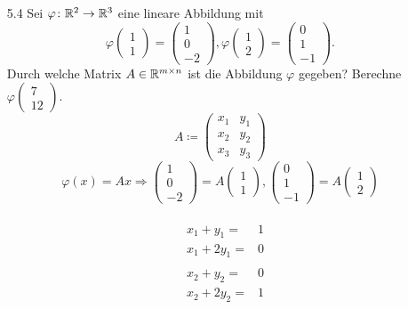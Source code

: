 \documentclass{HM}
\begin{document}
\begin{enumerate}
\begin{enumerate}
\\
\end{enumerate}
\item [5.4] Sei $\varphi\colon\mathbb{R}^2\to\mathbb{R}^3$ eine lineare Abbildung mit
$$\varphi\begin{pmatrix}
1\\
1
\end{pmatrix}=\begin{pmatrix}
1\\
0\\
-2
\end{pmatrix},
\varphi\begin{pmatrix}
1\\
2
\end{pmatrix}=\begin{pmatrix}
0\\
1\\
-1
\end{pmatrix}.$$
Durch welche Matrix $A\in\mathbb{R}^{m\times n}$ ist die Abbildung $\varphi$ gegeben? Berechne $\varphi\begin{pmatrix}
7\\
12
\end{pmatrix}$.\\
$$A\coloneqq\begin{pmatrix}
x_1&y_1\\
x_2&y_2\\
x_3&y_3
\end{pmatrix}$$
$$\varphi(x)=Ax
\Rightarrow \begin{pmatrix}
1\\
0\\
-2
\end{pmatrix}=A\begin{pmatrix}
1\\
1
\end{pmatrix},
\begin{pmatrix}
0\\
1\\
-1
\end{pmatrix}=A\begin{pmatrix}
1\\
2
\end{pmatrix}$$\\
\begin{align*}
&x_1+y_1=&1\\
&x_1+2y_1=&0\\\\
&x_2+y_2=&0\\
&x_2+2y_2=&1\\\\

\end{align*}
\end{enumerate}
\end{document}
